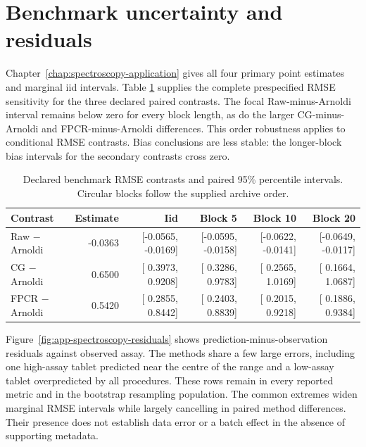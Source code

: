 \section{Benchmark uncertainty and residuals}
\label{sec:app-spectroscopy-uncertainty}

Chapter~\ref{chap:spectroscopy-application} gives all four primary point
estimates and marginal iid intervals.  Table
\ref{tab:app-spectroscopy-rmse-contrasts} supplies the complete prespecified
RMSE sensitivity for the three declared paired contrasts.  The focal
Raw-minus-Arnoldi interval remains below zero for every block length, as do the
larger CG-minus-Arnoldi and FPCR-minus-Arnoldi differences.  This order
robustness applies to conditional RMSE contrasts.  Bias conclusions are less
stable: the longer-block bias intervals for the secondary contrasts cross
zero.

\begin{table}[htbp]
    \centering
    \scriptsize
    \caption[Paired benchmark RMSE contrasts and intervals]{Declared benchmark RMSE contrasts and paired 95\% percentile
    intervals.  Circular blocks follow the supplied archive order.}
    \label{tab:app-spectroscopy-rmse-contrasts}
    \begin{tabular}{@{}lrrrrr@{}}
        \toprule
        Contrast & Estimate & Iid & Block 5 & Block 10 & Block 20 \\
        \midrule
        Raw $-$ Arnoldi
          & -0.0363 & [-0.0565, -0.0169] & [-0.0595, -0.0158]
          & [-0.0622, -0.0141] & [-0.0649, -0.0117] \\
        CG $-$ Arnoldi
          &  0.6500 & [ 0.3973,  0.9208] & [ 0.3286,  0.9783]
          & [ 0.2565,  1.0169] & [ 0.1664,  1.0687] \\
        FPCR $-$ Arnoldi
          &  0.5420 & [ 0.2855,  0.8442] & [ 0.2403,  0.8839]
          & [ 0.2015,  0.9218] & [ 0.1886,  0.9384] \\
        \bottomrule
    \end{tabular}
\end{table}

Figure~\ref{fig:app-spectroscopy-residuals} shows prediction-minus-observation
residuals against observed assay.  The methods share a few large errors,
including one high-assay tablet predicted near the centre of the range and a
low-assay tablet overpredicted by all procedures.  These rows remain in every
reported metric and in the bootstrap resampling population.  The common extremes widen marginal RMSE
intervals while largely cancelling in paired method differences.  Their
presence does not establish data error or a batch effect in the absence of
supporting metadata.

